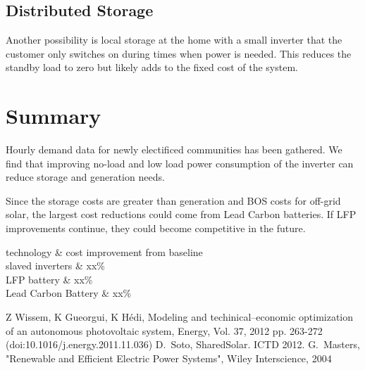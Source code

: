 \documentclass[conference]{IEEEtran}
\begin{document}
\subsection{Distributed Storage}
Another possibility is local storage at the home with a small inverter
that the customer only switches on during times when power
is needed.
This reduces the standby load to zero but likely adds to the
fixed cost of the system.


\section{Summary}
Hourly demand data for newly electificed communities has been gathered.
We find that improving no-load and low load power consumption of the
inverter can reduce storage and generation needs.

Since the storage costs are greater than generation and BOS costs
for off-grid solar, the largest cost reductions could come from
Lead Carbon batteries.
If LFP improvements continue, they could become competitive in the
future.



technology \& cost improvement from baseline \\
slaved inverters    \& xx\% \\
LFP battery         \& xx\% \\
Lead Carbon Battery \& xx\% \\


\begin{thebibliography}{1}
Z Wissem, K Gueorgui, K H\'edi,
Modeling and techinical--economic optimization of an autonomous
photovoltaic system,
Energy, Vol. 37, 2012 pp. 263-272
(doi:10.1016/j.energy.2011.11.036)
D.~Soto, SharedSolar. ICTD 2012.
G.~Masters,
"Renewable and Efficient Electric Power Systems",
Wiley Interscience,
2004
\end{thebibliography}
\end{document}
